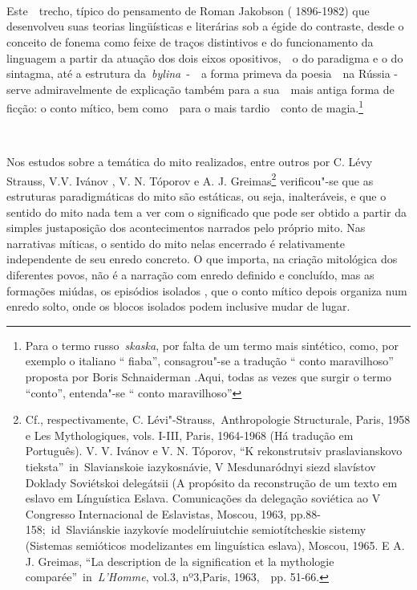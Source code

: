 ~

~

~

Este~~trecho, típico do pensamento de Roman Jakobson ( 1896-1982) que
desenvolveu suas teorias lingüísticas e literárias sob a égide do
contraste, desde o conceito de fonema como feixe de traços distintivos e
do funcionamento da linguagem a partir da atuação dos dois eixos
opositivos,~~o do paradigma e o do sintagma, até a estrutura
da~\emph{bylina}~-~~a forma primeva da poesia~~na Rússia - serve
admiravelmente de explicação também para a sua~~mais antiga forma de
ficção: o conto mítico, bem como~~para o mais tardio~~conto de
magia.\footnote{Para o termo russo~\emph{skaska}, por falta de um termo
  mais sintético, como, por exemplo o italiano `` fiaba'', consagrou"-se
  a tradução `` conto maravilhoso'' proposta por Boris Schnaiderman
  .Aqui, todas as vezes que surgir o termo ``conto'', entenda"-se ``
  conto maravilhoso''}

~

Nos estudos sobre a temática do mito realizados, entre outros por C.
Lévy Strauss, V.V. Ivánov , V. N. Tóporov e A. J. Greimas\footnote{Cf.,
  respectivamente, C. Lévi"-Strauss,~{Anthropologie Structurale}, Paris,
  1958 e Les Mythologiques, vols. I-III, Paris, 1964-1968 (Há tradução
  em Português). V. V. Ivánov e V. N. Tóporov, ``K rekonstrutsiv
  praslavianskovo tieksta''~{in}~Slavianskoie iazykosnávie, V
  Mesdunaródnyi siezd slavístov Doklady Soviétskoi delegátsii (A
  propósito da reconstrução de um texto em eslavo em Línguística Eslava.
  Comunicações da delegação soviética ao V Congresso Internacional de
  Eslavistas, Moscou, 1963, pp.88-158;~{id}~Slaviánskie iazykovíe
  modelíruiutchie semiotítcheskie sistemy (Sistemas semióticos
  modelizantes em linguística eslava), Moscou, 1965. E A. J. Greimas,
  ``La description de la signification et la mythologie
  comparée''~{in}~\emph{{L'Homme}}, vol.3, nº3,Paris, 1963,~~pp. 51-66.}
verificou"-se que as estruturas paradigmáticas do mito são estáticas, ou
seja, inalteráveis, e que o sentido do mito nada tem a ver com o
significado que pode ser obtido a partir da simples justaposição dos
acontecimentos narrados pelo próprio mito. Nas narrativas míticas, o
sentido do mito nelas encerrado é relativamente independente de seu
enredo concreto. O que importa, na criação mitológica dos diferentes
povos, não é a narração com enredo definido e concluído, mas as
formações miúdas, os episódios isolados , que o conto mítico depois
organiza num enredo solto, onde os blocos isolados podem inclusive mudar
de lugar.

